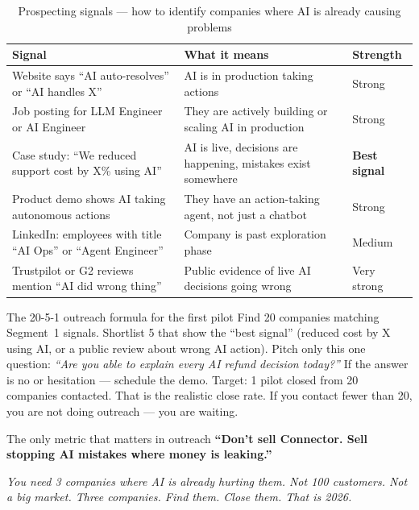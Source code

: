 \begin{table}[H]
\centering\renewcommand{\arraystretch}{1.55}
\begin{tabularx}{\textwidth}{@{}lXl@{}}
\toprule
\textbf{Signal} & \textbf{What it means} & \textbf{Strength} \\
\midrule
Website says ``AI auto-resolves'' or ``AI handles X'' &
  AI is in production taking actions & Strong \\
Job posting for LLM Engineer or AI Engineer &
  They are actively building or scaling AI in production & Strong \\
Case study: ``We reduced support cost by X\% using AI'' &
  AI is live, decisions are happening, mistakes exist somewhere &
  \textbf{Best signal} \\
Product demo shows AI taking autonomous actions &
  They have an action-taking agent, not just a chatbot & Strong \\
LinkedIn: employees with title ``AI Ops'' or ``Agent Engineer'' &
  Company is past exploration phase & Medium \\
Trustpilot or G2 reviews mention ``AI did wrong thing'' &
  Public evidence of live AI decisions going wrong & Very strong \\
\bottomrule
\end{tabularx}
\caption{Prospecting signals --- how to identify companies where AI is already causing problems}
\end{table}

\begin{insightbox}{The 20-5-1 outreach formula for the first pilot}
Find 20 companies matching Segment~1 signals. Shortlist 5 that show the
``best signal'' (reduced cost by X using AI, or a public review about wrong
AI action). Pitch only this one question: \textit{``Are you able to explain
every AI refund decision today?''} If the answer is no or hesitation ---
schedule the demo. Target: 1 pilot closed from 20 companies contacted.
That is the realistic close rate. If you contact fewer than 20, you are
not doing outreach --- you are waiting.
\end{insightbox}

\begin{conceptbox}{The only metric that matters in outreach}
\centering
\textbf{``Don't sell Connector. Sell stopping AI mistakes where money is leaking.''}

\smallskip
\textit{You need 3 companies where AI is already hurting them. Not 100 customers.
Not a big market. Three companies. Find them. Close them. That is 2026.}
\end{conceptbox}

